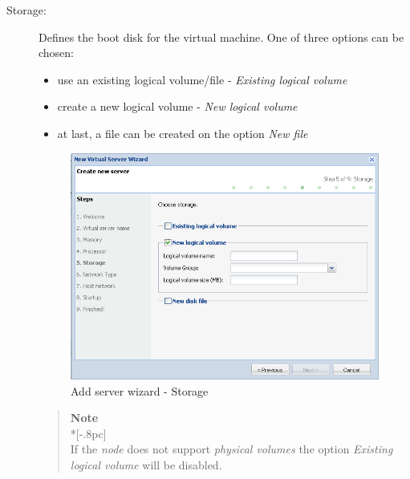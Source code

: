 \begin{description}
	\item[Storage:] Defines the boot disk for the virtual machine. One of three options can be chosen:
\begin{itemize}
	\item use an existing logical volume/file - \emph{Existing logical volume}
	\item create a new logical volume - \emph{New logical volume}
	\item at last, a file can be created on the option \emph{New file}
\end{itemize}

        \begin{figure}[H]
        		\begin{center}
	        	\includegraphics[scale=0.5]{screenshots/server_createwiz_storage.png}
	        	\caption{Add server wizard - Storage}
		        \label{fig:server_createwiz_storage}
        		\end{center}
		\end{figure}

		\begin{quote}
			{\large \bf Note} \\*[-.8pc]
			\underline{\hspace{6in}} \\
            If the \emph{node} does not support \emph{physical volumes} the option \emph{Existing logical volume} will be disabled.
		\end{quote}		
        

\end{description}

